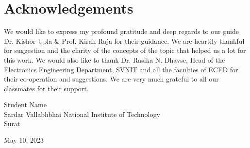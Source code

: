 
\chapter*{Acknowledgements}

We would like to express my profound gratitude and deep regards to our guide Dr. Kishor Upla & Prof. Kiran Raja for their guidance. We are heartily thankful for suggestion and the clarity of the concepts of the topic that helped us a lot for this work. We would also like to thank Dr. Rasika N. Dhavse, Head of the Electronics Engineering Department, SVNIT  and all the faculties of ECED for their co-operation and suggestions.
We are very much grateful to all our classmates for their support.

\begin{flushright} 
Student Name\\[0.01in]
Sardar Vallabhbhai National Institute of Technology\\
Surat\\
\end{flushright}

\begin{flushleft} 
May 10, 2023\\
\end{flushleft}

